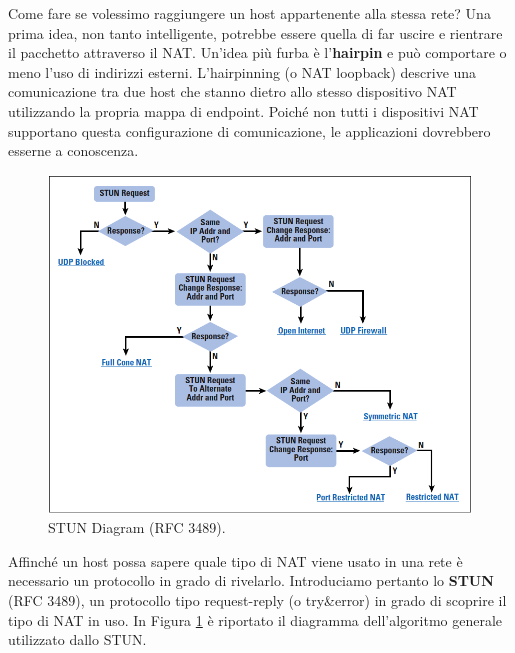 Come fare se volessimo raggiungere un host appartenente alla stessa rete? Una prima idea, non tanto intelligente, potrebbe essere quella di far uscire e rientrare il pacchetto attraverso il NAT. Un'idea più furba è l'\textbf{hairpin} e può comportare o meno l'uso di indirizzi esterni. L'hairpinning (o NAT loopback) descrive una comunicazione tra due host che stanno dietro allo stesso dispositivo NAT utilizzando la propria mappa di endpoint. Poiché non tutti i dispositivi NAT supportano questa configurazione di comunicazione, le applicazioni dovrebbero esserne a conoscenza.
\begin{figure}[htbp]
	\centering
	\includegraphics[scale = 0.4]{images/STUN}
	\caption{STUN Diagram (RFC 3489).}
	\label{img:STUN}
\end{figure}

Affinché un host possa sapere quale tipo di NAT viene usato in una rete è necessario un protocollo in grado di rivelarlo. Introduciamo pertanto lo \textbf{STUN} (RFC 3489), un protocollo tipo request-reply (o try\&error) in grado di scoprire il tipo di NAT in uso. In Figura \ref{img:STUN} è riportato il diagramma dell'algoritmo generale utilizzato dallo STUN.


